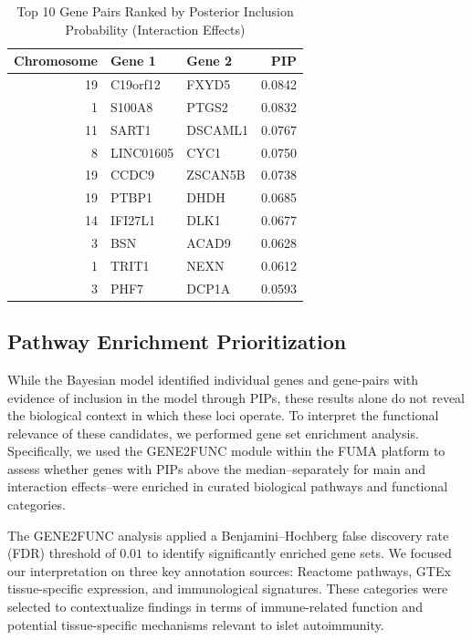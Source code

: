 \documentclass{article}\usepackage[]{graphicx}\usepackage[]{color}
\begin{document}
\begin{table}[ht]
\centering
\caption{Top 10 Gene Pairs Ranked by Posterior Inclusion Probability (Interaction Effects)}
\label{tab:top_intrxn_pairs}
\begin{tabular}{|r|l|l|r|}
\hline
\textbf{Chromosome} & \textbf{Gene 1} & \textbf{Gene 2} & \textbf{PIP} \\
\hline
19 & C19orf12  & FXYD5    & 0.0842 \\
1  & S100A8    & PTGS2    & 0.0832 \\
11 & SART1     & DSCAML1  & 0.0767 \\
8  & LINC01605 & CYC1     & 0.0750 \\
19 & CCDC9     & ZSCAN5B  & 0.0738 \\
19 & PTBP1     & DHDH     & 0.0685 \\
14 & IFI27L1   & DLK1     & 0.0677 \\
3  & BSN       & ACAD9    & 0.0628 \\
1  & TRIT1     & NEXN     & 0.0612 \\
3  & PHF7      & DCP1A    & 0.0593 \\
\hline
\end{tabular}
\end{table}


\subsection{Pathway Enrichment Prioritization}
While the Bayesian model identified individual genes and gene-pairs with evidence of inclusion in the model through PIPs, these results alone do not reveal the biological context in which these loci operate. To interpret the functional relevance of these candidates, we performed gene set enrichment analysis. Specifically, we used the GENE2FUNC module within the FUMA platform\cite{watanabeFunctionalMappingAnnotation2017} to assess whether genes with PIPs above the median--separately for main and interaction effects--were enriched in curated biological pathways and functional categories.
\par 
The GENE2FUNC analysis applied a Benjamini–Hochberg false discovery rate (FDR) threshold of $0.01$ to identify significantly enriched gene sets. We focused our interpretation on three key annotation sources: Reactome pathways, GTEx tissue-specific expression, and immunological signatures. These categories were selected to contextualize findings in terms of immune-related function and potential tissue-specific mechanisms relevant to islet autoimmunity.
\end{document}
